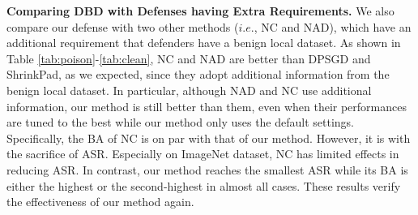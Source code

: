 \begin{table*}[ht]
\centering
\caption{The effectiveness (\%) of defending against label-consistent attack on CIFAR-10 dataset. %
}
\label{tab:clean}
\vspace{-0.9em}
\end{table*}

\noindent \textbf{Comparing DBD with Defenses having Extra Requirements.}
We also compare our defense with two other methods ($i.e.$, NC and NAD), which have an additional requirement that defenders have a benign local dataset. As shown in Table \ref{tab:poison}-\ref{tab:clean}, NC and NAD are better than DPSGD and ShrinkPad, as we expected, since they adopt additional information from the benign local dataset. In particular, although NAD and NC use additional information, our method is still better than them, even when their performances are tuned to the best while our method only uses the default settings. Specifically, the BA of NC is on par with that of our method. However, it is with the sacrifice of ASR. Especially on ImageNet dataset, NC has limited effects in reducing ASR. In contrast, our method reaches the smallest ASR while its BA is either the highest or the second-highest in almost all cases. These results verify the effectiveness of our method again.


